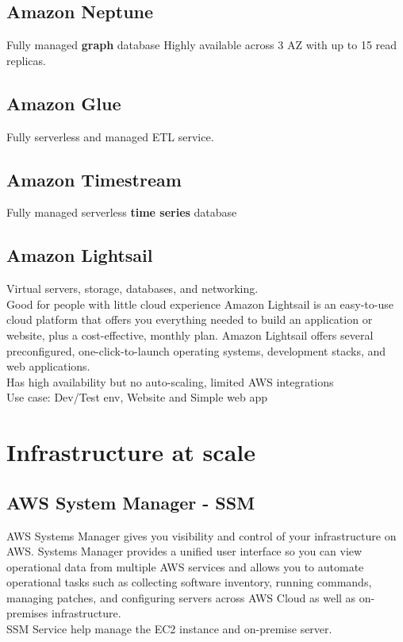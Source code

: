 \documentclass[12pt, letterpaper, twoside]{article}
\begin{document}
\subsection{Amazon Neptune}
Fully managed \textbf{graph} database
Highly available across 3 AZ with up to 15 read replicas.\\

\subsection{Amazon Glue}
Fully serverless and managed ETL service.\\

\subsection{Amazon Timestream}
Fully managed serverless \textbf{time series} database

\subsection{Amazon Lightsail}
Virtual servers, storage, databases, and networking.\\
Good for people with little cloud experience
Amazon Lightsail is an easy-to-use cloud platform that offers you everything needed to build an application 
or website, plus a cost-effective, monthly plan. Amazon Lightsail offers several preconfigured, one-click-to-launch operating 
systems, development stacks, and web applications.\\
Has high availability but no auto-scaling, limited AWS integrations\\
Use case: Dev/Test env, Website and Simple web app\\

\section{Infrastructure at scale}

\subsection{AWS System Manager - SSM}
AWS Systems Manager gives you visibility and control of your infrastructure on AWS. Systems Manager provides a 
unified user interface so you can view operational data from multiple AWS services and allows you to automate 
operational tasks such as collecting software inventory, running commands, managing patches, and configuring 
servers across AWS Cloud as well as on-premises infrastructure.\\
SSM Service help manage the EC2 instance and on-premise server.\\
\end{document}
